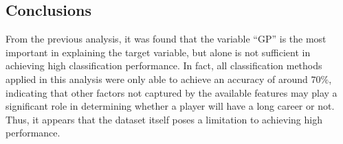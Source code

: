 \subsection{Conclusions}

From the previous analysis, it was found that the variable ``GP'' is the most important in explaining the target variable, but alone is not sufficient in achieving high classification performance. In fact, all classification methods applied in this analysis were only able to achieve an accuracy of around $70\%$, indicating that other factors not captured by the available features may play a significant role in determining whether a player will have a long career or not. Thus, it appears that the dataset itself poses a limitation to achieving high performance.